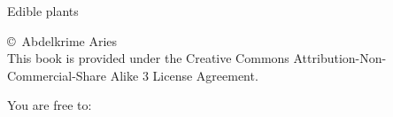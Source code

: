 %
%
%

\newpage

{\Huge Edible plants}

\vfill

  \copyright\ Abdelkrime Aries \\[0.5cm]
This book is provided under the Creative Commons Attribution-Non-Commercial-Share Alike 3 License Agreement.

\vspace{1cm}

\noindent
You are free to:
